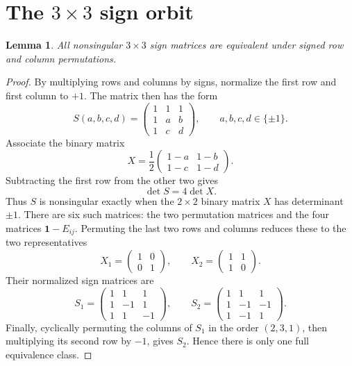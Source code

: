 \documentclass[11pt]{article}
\newtheorem{lemma}[theorem]{Lemma}
\newcommand{\one}{\mathbf 1}
\begin{document}
\section{The \texorpdfstring{\(3\times3\)}{3 by 3} sign orbit}

\begin{lemma}\label{lem:orbit}
All nonsingular \(3\times3\) sign matrices are equivalent under signed row
and column permutations.
\end{lemma}

\begin{proof}
By multiplying rows and columns by signs, normalize the first row and first
column to \(+1\). The matrix then has the form
\[
 S(a,b,c,d)=
 \begin{pmatrix}
 1&1&1\\
 1&a&b\\
 1&c&d
 \end{pmatrix},
 \qquad a,b,c,d\in\{\pm1\}.
\]
Associate the binary matrix
\[
 X=\frac12
 \begin{pmatrix}
 1-a&1-b\\
 1-c&1-d
 \end{pmatrix}.
\]
Subtracting the first row from the other two gives
\[
 \det S=4\det X.
\]
Thus \(S\) is nonsingular exactly when the \(2\times2\) binary matrix \(X\)
has determinant \(\pm1\). There are six such matrices: the two permutation
matrices and the four matrices \(\one-E_{ij}\). Permuting the last two rows
and columns reduces these to the two representatives
\[
 X_1=\begin{pmatrix}1&0\\0&1\end{pmatrix},
 \qquad
 X_2=\begin{pmatrix}1&1\\1&0\end{pmatrix}.
\]
Their normalized sign matrices are
\[
 S_1=\begin{pmatrix}1&1&1\\1&-1&1\\1&1&-1\end{pmatrix},
 \qquad
 S_2=\begin{pmatrix}1&1&1\\1&-1&-1\\1&-1&1\end{pmatrix}.
\]
Finally, cyclically permuting the columns of \(S_1\) in the order
\((2,3,1)\), then multiplying its second row by \(-1\), gives \(S_2\).
Hence there is only one full equivalence class.
\end{proof}
\end{document}
